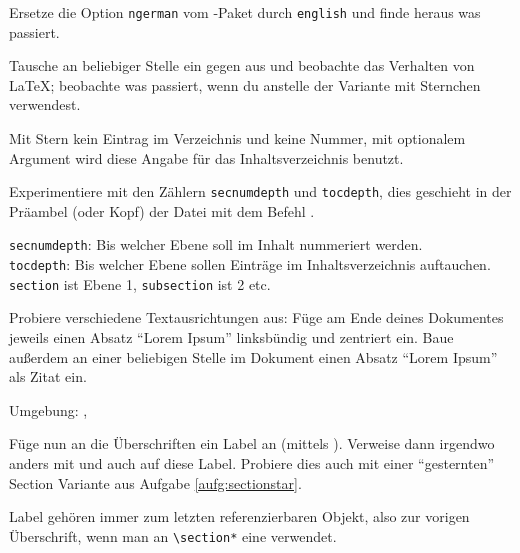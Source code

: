 \begin{uebung}
\item Ersetze die Option \texttt{ngerman} vom -Paket durch
	\texttt{english} und finde heraus was passiert.

\item Tausche an beliebiger Stelle ein  gegen 
	 aus und beobachte das Verhalten von \LaTeX; 
	beobachte was passiert, wenn du  
	anstelle der Variante mit Sternchen verwendest.
	\label{aufg:sectionstar}
	\begin{loesung}
	    Mit Stern kein Eintrag im Verzeichnis und keine Nummer, mit optionalem
	    Argument wird diese Angabe für das Inhaltsverzeichnis benutzt.
	\end{loesung}

\item Experimentiere mit den Zählern \texttt{secnumdepth} und 
	\texttt{tocdepth}, dies geschieht in der Präambel (oder Kopf) der Datei mit dem
	Befehl . \label{zaehler}
	\begin{loesung}
	    \texttt{secnumdepth}: Bis welcher Ebene soll im Inhalt nummeriert werden.\\ 
	    \texttt{tocdepth}: Bis welcher Ebene sollen Einträge im Inhaltsverzeichnis auftauchen.\\
	    \texttt{section} ist Ebene 1, \texttt{subsection} ist 2 etc.
	\end{loesung}

\item Probiere verschiedene Textausrichtungen aus: Füge am Ende
    deines Dokumentes jeweils einen Absatz \enquote{Lorem Ipsum}
    linksbündig und zentriert ein. Baue außerdem an einer beliebigen Stelle
    im Dokument einen Absatz \enquote{Lorem Ipsum} als Zitat ein.
    \begin{loesung}
        Umgebung: , 
    \end{loesung}

\item Füge nun an die Überschriften ein Label an (mittels ).
    Verweise dann irgendwo anders mit  und auch
     auf diese Label. Probiere dies auch mit einer \enquote{gesternten}
    Section Variante aus Aufgabe \ref{aufg:sectionstar}.
    \begin{loesung}
        Label gehören immer zum letzten referenzierbaren Objekt, also zur vorigen Überschrift, wenn man an \verb|\section*| eine verwendet.
    \end{loesung}


\end{uebung}
